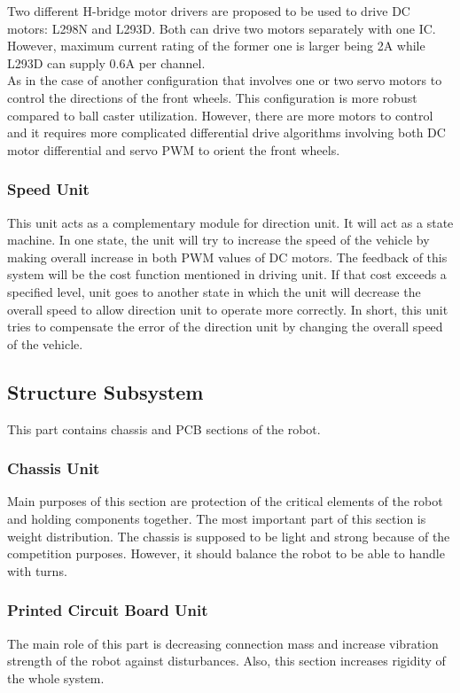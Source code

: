 \documentclass[a4paper,12pt]{article}
\begin{document}
Two different H-bridge motor drivers are proposed to be used to drive DC motors: L298N and L293D. Both can drive two motors separately with one IC. However, maximum current rating of the former one is larger being 2A while L293D can supply 0.6A per channel. \\

As in the case of another configuration that involves one or two servo motors to control the directions of the front wheels. This configuration is more robust compared to ball caster utilization. However, there are more motors to control and it requires more complicated differential drive algorithms involving both DC motor differential and servo PWM to orient the front wheels.
\subsubsection{Speed Unit}

This unit acts as a complementary module for direction unit. It will act as a state machine. In one state, the unit will try to increase the speed of the vehicle by making overall increase in both PWM values of DC motors. The feedback of this  system will be the cost function mentioned in driving unit. If that cost exceeds a specified level, unit goes to another state in which the unit will decrease the overall speed to allow direction unit to operate more correctly. In short, this unit tries to compensate the error of the direction unit by changing the overall speed of the vehicle.
 

\subsection{Structure Subsystem}
This part contains chassis and PCB sections of the robot. 
\subsubsection{Chassis Unit}
Main purposes of this section are protection of the critical elements of the robot and holding components together. The most important part of this section is weight distribution. The chassis is supposed to be light and strong because of the competition purposes. However, it should balance the robot to be able to handle with turns. 
\subsubsection{Printed Circuit Board Unit}
The main role of this part is decreasing connection mass and increase vibration strength of the robot against disturbances. Also, this section increases rigidity of the whole system. 
\end{document}
